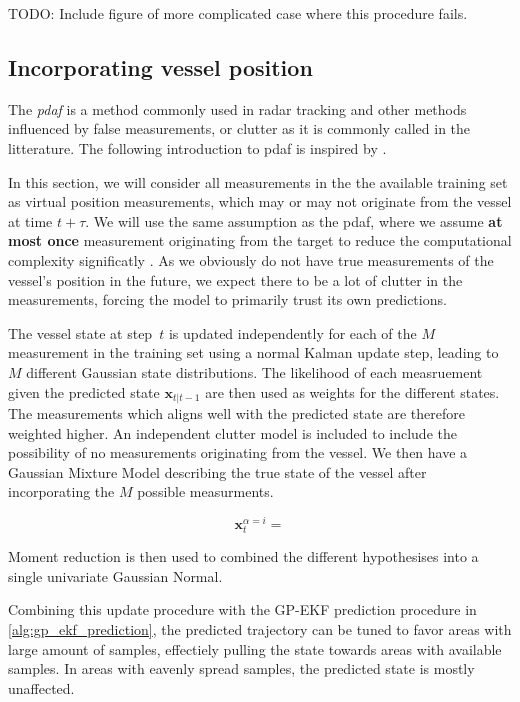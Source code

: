 TODO: Include figure of more complicated case where this procedure fails.

\subsection{Incorporating vessel position}
The \textit{\acrfull{pdaf}} is a method commonly used in radar tracking and other methods influenced by false measurements, or clutter as it is commonly called in the litterature. The following introduction to \acrshort{pdaf} is inspired by \cite{sensorfusjon}.

In this section, we will consider all measurements in the the available training set as virtual position measurements, which may or may not originate from the vessel at time $t + \tau$. We will use the same assumption as the \acrshort{pdaf}, where we assume \textbf{at most once} measurement originating from the target to reduce the computational complexity significatly \cite{sensorfusjon}. As we obviously do not have true measurements of the vessel's position in the future, we expect there to be a lot of clutter in the measurements, forcing the model to primarily trust its own predictions. 

The vessel state at step $t$ is updated independently for each of the $M$ measurement in the training set using a normal Kalman update step, leading to $M$ different Gaussian state distributions. The likelihood of each measruement given the predicted state $\boldsymbol{x}_{t | t-1}$ are then used as weights for the different states. The measurements which aligns well with the predicted state are therefore weighted higher. An independent clutter model is included to include the possibility of no measurements originating from the vessel. We then have a Gaussian Mixture Model describing the true state of the vessel after incorporating the $M$ possible measurments.

\begin{equation}
    \boldsymbol{x}_t^{\alpha=i} = \text{}
\end{equation}

Moment reduction is then used to combined the different hypothesises into a single univariate Gaussian Normal.

Combining this update procedure with the GP-EKF prediction procedure in \cref{alg:gp_ekf_prediction}, the predicted trajectory can be tuned to favor areas with large amount of samples, effectiely pulling the state towards areas with available samples. In areas with eavenly spread samples, the predicted state is mostly unaffected.

